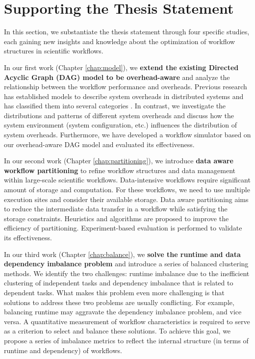 \section{Supporting the Thesis Statement}

In this section, we substantiate the thesis statement through four specific studies, each gaining new insights and knowledge about the optimization of workflow structures in scientific workflows. 

In our first work \cite{Chen2011} (Chapter \ref{chap:model}), we \textbf{extend the existing Directed Acyclic Graph (DAG) model to be overhead-aware} and analyze the relationship between the workflow performance and overheads. Previous research has established models to describe system overheads in distributed systems and has classified them into several categories \cite{Prodan2007, Prodan2008}. In contrast, we investigate the distributions and patterns of different system overheads and discuss how the system environment (system configuration, etc.) influences the distribution of system overheads. Furthermore, we have developed a workflow simulator based on our overhead-aware DAG model and evaluated its effectiveness. 

In our second work \cite{Integration2012, Chen2011a} (Chapter \ref{chap:partitioning}), we introduce \textbf{data aware workflow partitioning} to refine workflow structures and data management within large-scale scientific workflows. Data-intensive workflows require significant amount of storage and computation. For these workflows, we need to use multiple execution sites and consider their available storage. Data aware partitioning aims to reduce the intermediate data transfer in a workflow while satisfying the storage constraints. Heuristics and algorithms are proposed to improve the efficiency of partitioning. Experiment-based evaluation is performed to validate its effectiveness.  

In our third work \cite{Chen2013a,Chen2013b} (Chapter \ref{chap:balance}), we \textbf{solve the runtime and data dependency imbalance problem} and introduce a series of balanced clustering methods. 
We identify the two challenges: runtime imbalance due to the inefficient clustering of independent tasks and dependency imbalance that is related to dependent tasks. What makes this problem even more challenging is that solutions to address these two problems are usually conflicting. For example, balancing runtime may aggravate the dependency imbalance problem, and vice versa. A quantitative measurement of workflow characteristics is required to serve as a criterion to select and balance these solutions. To achieve this goal, we propose a series of imbalance metrics to reflect the internal structure (in terms of runtime and dependency) of workflows. 

